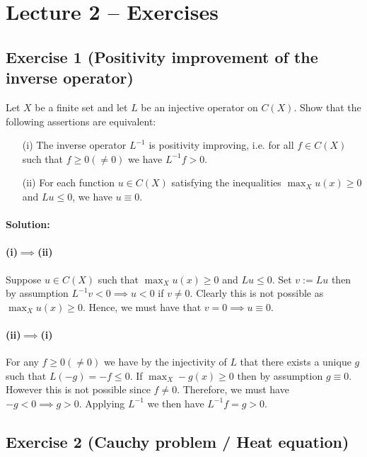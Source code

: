 \section{Lecture 2 -- Exercises}

\subsection{Exercise 1 (Positivity improvement of the inverse operator)}

Let $X$ be a finite set and let $L$ be an injective operator on $C(X)$. Show that the following assertions are equivalent:
\begin{itemize}
	\item [(i)]
		The inverse operator $L^{-1}$ is positivity improving, i.e. for all $f\in C(X)$ such that $f\geq 0(\neq 0)$ we have $L^{-1}f>0$.
	\item [(ii)]
		For each function $u\in C(X)$ satisfying the inequalities $\max_{X} u(x)\geq 0$ and $Lu\leq 0$, we have $u\equiv 0$.
\end{itemize}

\paragraph{Solution:}

\paragraph{(i)$\implies$(ii)}
Suppose $u\in C(X)$ such that $\max_{X}u(x)\geq 0$ and $Lu\leq 0$. Set $v:=Lu$ then by assumption $L^{-1}v<0\implies u<0$ if $v\neq 0$. Clearly this is not possible as $\max_{X}u(x)\geq 0$. Hence, we must have that $v=0\implies u\equiv 0$.

\paragraph{(ii)$\implies$(i)}
For any $f\geq 0(\neq 0)$ we have by the injectivity of $L$ that there exists a unique $g$ such that $L(-g)=-f\leq 0$. If $\max_{X}-g(x)\geq 0$ then by assumption $g\equiv 0$. However this is not possible since $f\neq 0$. Therefore, we must have $-g<0\implies g>0$. Applying $L^{-1}$ we then have $L^{-1}f=g>0$.

\subsection{Exercise 2 (Cauchy problem / Heat equation)}

